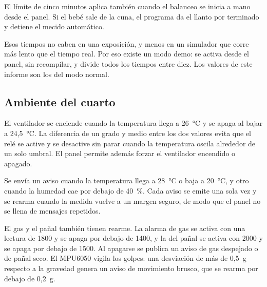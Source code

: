 El límite de cinco minutos aplica también cuando el balanceo se inicia a mano desde el
panel. Si el bebé sale de la cuna, el programa da el llanto por terminado y detiene el
mecido automático.

Esos tiempos no caben en una exposición, y menos en un simulador que corre más lento que
el tiempo real. Por eso existe un modo demo: se activa desde el panel, sin recompilar, y
divide todos los tiempos entre diez. Los valores de este informe son los del modo normal.

\subsection{Ambiente del cuarto}

El ventilador se enciende cuando la temperatura llega a 26~°C y se apaga al bajar a
24,5~°C. La diferencia de un grado y medio entre los dos valores evita que el relé se
active y se desactive sin parar cuando la temperatura oscila alrededor de un solo
umbral. El panel permite además forzar el ventilador encendido o apagado.

Se envía un aviso cuando la temperatura llega a 28~°C o baja a 20~°C, y otro cuando
la humedad cae por debajo de 40~\%. Cada aviso se emite una sola vez y se rearma
cuando la medida vuelve a un margen seguro, de modo que el panel no se llena de
mensajes repetidos.

El gas y el pañal también tienen rearme. La alarma de gas se activa con una lectura de
1800 y se apaga por debajo de 1400, y la del pañal se activa con 2000 y se apaga por
debajo de 1500. Al apagarse se publica un aviso de gas despejado o de pañal seco. El
MPU6050 vigila los golpes: una desviación de más de 0,5~g respecto a la gravedad genera
un aviso de movimiento brusco, que se rearma por debajo de 0,2~g.


